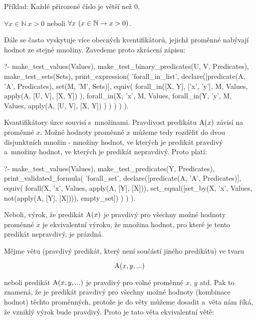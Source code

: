 Příklad: Každé přirozené číslo je větší než 0. 

\(\forall x \in \mathbb{N} \ x > 0\) neboli \(\forall x \ (x \in \mathbb{N} \rightarrow x > 0)\).

Dále se často vyskytuje více obecných kventifikátorů, jejichž proměnné nabývají hodnot ze stejné množiny. Zavedeme proto zkrácení zápisu:

\begin{prolog}
?- 	make_test_values(Values),
	make_test_binary_predicates(U, V, Predicates),
	make_test_sets(Sets),
	print_expression(
		'forall_in_list',
		declare([predicate(A, 'A', Predicates), set(M, 'M', Sets)],
			equiv(
				forall_in([X, Y], ['x', 'y'], M, Values, 
					apply(A, [U, V], [X, Y])
				),
				forall_in(X, 'x', M, Values, 
					forall_in(Y, 'y', M, Values, 
						apply(A, [U, V], [X, Y])
					)
				)
			)
		)
	).
\end{prolog}

Kvantifikátory úzce souvisí s~množinami. Pravdivost predikátu \(\mathrm{A}(x)\) závisí na proměnné \(x\). Možné hodnoty
proměnné \(x\) můžeme tedy rozdělit do dvou disjunktních množin - množiny hodnot, ve kterých je predikát pravdivý a~množiny hodnot, ve kterých je predikát nepravdivý. Proto platí:

\begin{prolog}
?- 	make_test_values(Values),
	make_test_predicates(Y, Predicates),
	print_validated_formula(
		'forall_set',
		declare([predicate(A, 'A', Predicates)],
			equiv(
				forall(X, 'x', Values, apply(A, [Y], [X])),
				set_equal([set_by(X, 'x', Values, not(apply(A, [Y], [X]))), empty_set])
			)
		)
	).
\end{prolog}

Neboli, výrok, že predikát \(\mathrm{A}(x)\) je pravdivý pro všechny možné hodnoty proměnné \(x\) je ekvivalentní výroku, že množina hodnot, pro které je tento predikát nepravdivý, je prázdná.

Mějme větu (pravdivý predikát, který není součástí jiného predikátu) ve tvaru

\begin{equation}
\mathrm{A}(x, y, ...)
\end{equation}

neboli predikát \(\mathrm{A}(x, y, ...)\) je pravdivý pro volné proměnné \(x\), \(y\) atd. Pak to znamená,
že je predikát pravdivý pro všechny možné hodnoty (kombinace hodnot) těchto proměnných, protože je do věty můžeme dosadit a~věta nám říká, že vzniklý výrok bude pravdivý. Proto je tato věta ekvivalentní větě:

